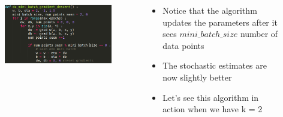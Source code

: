\begin{frame}
	\begin{columns}
		\begin{overlayarea}{\textwidth}{\textheight}
			\vspace{-0.15in}
			\begin{figure}
				\includegraphics[scale=0.3]{images/module6/pseudo_code_mini_batch_gd_crop.png}
			\end{figure}
			
		\end{overlayarea}
		
		
		\begin{overlayarea}{\textwidth}{\textheight}
			
			\begin{itemize}\justifying
				\item<1-> Notice that the algorithm updates the parameters after it sees $mini\_batch\_size$ number of data points
				\item<2-> The stochastic estimates are now slightly better
				\item<3-> Let's see this algorithm in action when we have k = 2
			\end{itemize}
			
		\end{overlayarea}
		
	\end{columns}
\end{frame}


